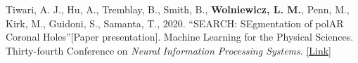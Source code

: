 \begin{cventries}
{\begin{cvitemize2}
        \vspace{1mm}
        \item \label{search}
            Tiwari, A. J., Hu, A., Tremblay, B., Smith, B., \textbf{Wolniewicz, L. M.}, Penn, M., Kirk, M., Guidoni, S., Samanta, T., 2020. ``SEARCH: SEgmentation of polAR Coronal Holes''[Paper presentation]. Machine Learning for the Physical Sciences. Thirty-fourth Conference on \textit{Neural Information Processing Systems}. \href{https://ml4physicalsciences.github.io/2020/files/NeurIPS_ML4PS_2020_83.pdf}{\textcolor{link}{[Link]}}
	\end{cvitemize2}
	\vspace{-2mm}
}

\end{cventries}

